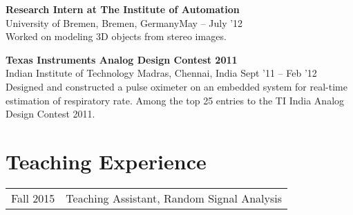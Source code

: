 \documentclass[margin,line,pifont,palatino,courier]{res}
\begin{document}
\begin{resume}

\textbf{Research Intern at The Institute of Automation}  \\
University of Bremen, Bremen, Germany\hfill May -- July '12 \vspace{2pt}\\
Worked on modeling 3D objects from stereo images. %

\textbf{Texas Instruments Analog Design Contest 2011} \\
Indian Institute of Technology Madras, Chennai, India \hfill Sept '11 -- Feb '12 \vspace{2pt} \\
Designed and constructed a pulse oximeter on an embedded system for real-time estimation of respiratory rate. Among the top 25 entries to the TI India Analog Design Contest 2011.\\
\vspace{-5pt}

\section{\sc Teaching Experience}
\begin{tabular}{@{}p{0.9in} p{4in}}
Fall 2015 & Teaching Assistant, Random Signal Analysis \\
\end{tabular}


\end{resume}
\end{document}

